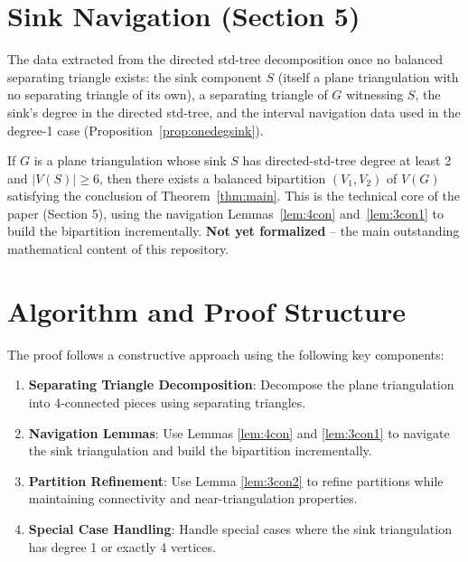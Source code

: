\section{Sink Navigation (Section 5)}

\begin{definition}
\label{def:sinkdata}
The data extracted from the directed std-tree decomposition once no balanced separating triangle exists: the sink component $S$ (itself a plane triangulation with no separating triangle of its own), a separating triangle of $G$ witnessing $S$, the sink's degree in the directed std-tree, and the interval navigation data used in the degree-1 case (Proposition~\ref{prop:onedegsink}).
\end{definition}

\begin{proposition}
\label{prop:sinknav}
\notready
If $G$ is a plane triangulation whose sink $S$ has directed-std-tree degree at least 2 and $|V(S)| \geq 6$, then there exists a balanced bipartition $(V_1, V_2)$ of $V(G)$ satisfying the conclusion of Theorem~\ref{thm:main}. This is the technical core of the paper (Section 5), using the navigation Lemmas~\ref{lem:4con} and~\ref{lem:3con1} to build the bipartition incrementally. \textbf{Not yet formalized} -- the main outstanding mathematical content of this repository.
\end{proposition}

\section{Algorithm and Proof Structure}

The proof follows a constructive approach using the following key components:

\begin{enumerate}
\item {\bf Separating Triangle Decomposition}: Decompose the plane triangulation into 4-connected pieces using separating triangles.
\item {\bf Navigation Lemmas}: Use Lemmas \ref{lem:4con} and \ref{lem:3con1} to navigate the sink triangulation and build the bipartition incrementally.
\item {\bf Partition Refinement}: Use Lemma \ref{lem:3con2} to refine partitions while maintaining connectivity and near-triangulation properties.
\item {\bf Special Case Handling}: Handle special cases where the sink triangulation has degree 1 or exactly 4 vertices.
\end{enumerate}

